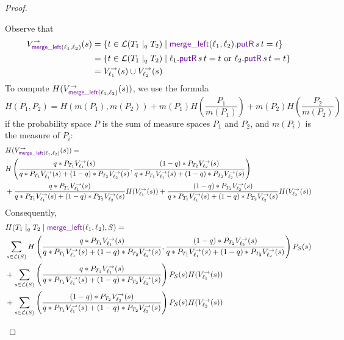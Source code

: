 \documentclass[acmsmall,screen,anonymous]{acmart}
\begin{document}
\begin{proof}
\begin{enumerate}
Observe that 
\begin{align*}
V^{\rightarrow}_{ \MergeLOf{\Lens_1}{\Lens_2}}(s) &= \{t \in \mathcal{L}(T_1 \; |_q \; T_2) \; | \;  \MergeLOf{\Lens_1}{\Lens_2}.\PutROf{s}{t} = t\}\\
&= \{t \in \mathcal{L}(T_1 \; |_q \; T_2) \; | \;  \ell_1.\PutROf{s}{t} = t \text{ or } \ell_2.\PutROf{s}{t} = t\}\\
&= V^{\rightarrow}_{\ell_1}(s) \cup V^{\rightarrow}_{\ell_2}(s)
\end{align*}
To compute $H(V^{\rightarrow}_{ \MergeLOf{\Lens_1}{\Lens_2}}(s))$, we use the formula 
$$H(P_1, P_2) = H(m(P_1), m(P_2)) + m(P_1)H\left(\frac{P_1}{m(P_1)}\right) + m(P_2)H\left(\frac{P_2}{m(P_2)}\right)$$
if the probability space $P$ is the sum of measure spaces $P_1$ and $P_2$, and $m(P_i)$ is the measure of $P_i$:
\begin{align*}
&H(V^{\rightarrow}_{ \MergeLOf{\Lens_1}{\Lens_2}}(s)) =\\
&H \left(\frac{q * P_{T_1}V^{\rightarrow}_{\ell_1}(s)}{q * P_{T_1}V^{\rightarrow}_{\ell_1}(s) + (1-q) * P_{T_2}V^{\rightarrow}_{\ell_2}(s)}, \frac{(1-q) * P_{T_2}V^{\rightarrow}_{\ell_2}(s)}{q * P_{T_1}V^{\rightarrow}_{\ell_1}(s) + (1-q) * P_{T_2}V^{\rightarrow}_{\ell_2}(s)}\right)\\
&+ \frac{q * P_{T_1}V^{\rightarrow}_{\ell_1}(s)}{q * P_{T_1}V^{\rightarrow}_{\ell_1}(s) + (1-q) * P_{T_2}V^{\rightarrow}_{\ell_2}(s)} H(V^{\rightarrow}_{\ell_1}(s)) + \frac{(1-q) * P_{T_2}V^{\rightarrow}_{\ell_2}(s)}{q * P_{T_1}V^{\rightarrow}_{\ell_1}(s) + (1-q) * P_{T_2}V^{\rightarrow}_{\ell_2}(s)} H(V^{\rightarrow}_{\ell_2}(s))
\end{align*}
Consequently,
\begin{align*}
&H(T_1 \; |_q \; T_2 \; | \; \MergeLOf{\Lens_1}{\Lens_2}, S) = \\
&\sum_{s \in \mathcal{L}(S)}H \left(\frac{q * P_{T_1}V^{\rightarrow}_{\ell_1}(s)}{q * P_{T_1}V^{\rightarrow}_{\ell_1}(s) + (1-q) * P_{T_2}V^{\rightarrow}_{\ell_2}(s)}, \frac{(1-q) * P_{T_2}V^{\rightarrow}_{\ell_2}(s)}{q * P_{T_1}V^{\rightarrow}_{\ell_1}(s) + (1-q) * P_{T_2}V^{\rightarrow}_{\ell_2}(s)}\right)P_S(s)\\
&+ \sum_{s \in \mathcal{L}(S)}\left(\frac{q * P_{T_1}V^{\rightarrow}_{\ell_1}(s)}{q * P_{T_1}V^{\rightarrow}_{\ell_1}(s) + (1-q) * P_{T_2}V^{\rightarrow}_{\ell_2}(s)}\right)P_S(s)H(V^{\rightarrow}_{\ell_1}(s))\\
&+ \sum_{s \in \mathcal{L}(S)}\left(\frac{(1-q) * P_{T_2}V^{\rightarrow}_{\ell_2}(s)}{q * P_{T_1}V^{\rightarrow}_{\ell_1}(s) + (1-q) * P_{T_2}V^{\rightarrow}_{\ell_2}(s)}\right)P_S(s)H(V^{\rightarrow}_{\ell_2}(s))

\end{align*}
\end{enumerate}
\end{proof}
\end{document}
